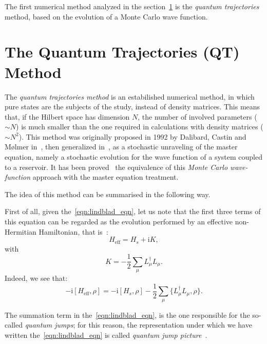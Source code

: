 The first numerical method analyzed in the section~\ref{chapt3_qtm} is the \emph{quantum trajectories} method, based on the evolution of a Monte Carlo wave function.

\section{The Quantum Trajectories (QT) Method}
\label{chapt3_qtm}
The \emph{quantum trajectories method} is an estabilished numerical method, in which pure states are the subjects of the study, instead of density matrices. This means that, if the Hilbert space has dimension $N$, the number of involved parameters ($\sim N$) is much smaller than the one required in calculations with density matrices ($\sim N^2$). This method was originally proposed in 1992 by Dalibard, Castin and Mølmer in~\cite{PhysRevLett.68.580}, then generalized in~\cite{Molmer:93}, as a stochastic unraveling of the master equation, namely a stochastic evolution for the wave function of a system coupled to a reservoir. It has been proved~\cite{PhysRevLett.68.580, Molmer:93} the equivalence of this \emph{Monte Carlo wave-function} approach with the master equation treatment.

The idea of this method can be summarised in the following way.

First of all, given the~\ref{eqn:lindblad_eqn}, let us note that the first three terms of this equation can be regarded as the evolution performed by an effective non-Hermitian Hamiltonian, that is~\cite{PhysRevA.69.062317}:
\begin{equation*}
    H_{\text{eff}} = H_s + \text{i}K,
\end{equation*}
with
\begin{equation*}
    K = -\frac{1}{2}\sum_\mu L_{\mu}^{\dagger}L_{\mu}.
\end{equation*}
Indeed, we see that:
\begin{equation*}
    -\text{i}[H_\text{eff}, \rho] = -\text{i}[H_s, \rho] - \frac{1}{2}\sum_\mu \{L_{\mu}^{\dagger}L_{\mu}, \rho\}.
\end{equation*}

The summation term in the~\ref{eqn:lindblad_eqn}, is the one responsible for the so-called \emph{quantum jumps}; for this reason, the representation under which we have written the~\ref{eqn:lindblad_eqn} is called \emph{quantum jump picture}~\cite{PhysRevA.69.062317}. 

